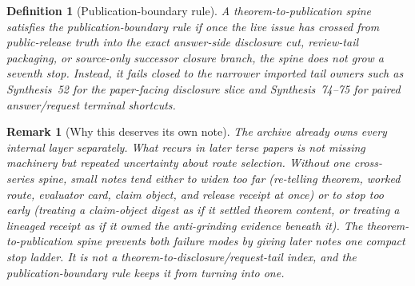 \documentclass[11pt]{article}
\newtheorem{definition}{Definition}
\newtheorem{remark}{Remark}
\begin{document}
\begin{definition}[Publication-boundary rule]
A theorem-to-publication spine satisfies the \emph{publication-boundary rule} if once the live issue has crossed from public-release truth into the exact answer-side disclosure cut, review-tail packaging, or source-only successor closure branch, the spine does not grow a seventh stop. Instead, it fails closed to the narrower imported tail owners such as Synthesis~52 for the paper-facing disclosure slice and Synthesis~74--75 for paired answer/request terminal shortcuts.
\end{definition}

\begin{remark}[Why this deserves its own note]
The archive already owns every internal layer separately.
What recurs in later terse papers is not missing machinery but repeated uncertainty about route selection.
Without one cross-series spine, small notes tend either to widen too far (re-telling theorem, worked route, evaluator card, claim object, and release receipt at once) or to stop too early (treating a claim-object digest as if it settled theorem content, or treating a lineaged receipt as if it owned the anti-grinding evidence beneath it).
The theorem-to-publication spine prevents both failure modes by giving later notes one compact stop ladder. It is not a theorem-to-disclosure/request-tail index, and the publication-boundary rule keeps it from turning into one.
\end{remark}
\end{document}
